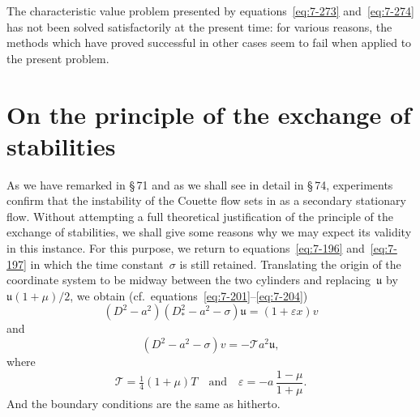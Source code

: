 The characteristic value problem presented by equations~\eqref{eq:7-273} and~\eqref{eq:7-274} has not been solved satisfactorily at the present time: for various
reasons, the methods which have proved successful in other cases seem
to fail when applied to the present problem.


\section{On the principle of the exchange of stabilities}\label{sec:7-72}

As we have remarked in \S\,71 and as we shall see in detail in \S\,74,
experiments confirm that the instability of the Couette flow sets in as a
secondary stationary flow.  Without attempting a full theoretical
justification of the principle of the exchange of stabilities, we shall give
some reasons why we may expect its validity in this instance.  For this
purpose, we return to equations~\eqref{eq:7-196} and~\eqref{eq:7-197} in which the time
constant~$\sigma$ is still retained.  Translating the origin of the coordinate
system to be midway between the two cylinders and replacing~$\mathfrak{u}$ by
$\mathfrak{u}(1+\mu)/2$, we obtain (cf.\ equations~\eqref{eq:7-201}--\eqref{eq:7-204})
\begin{equation}
\label{eq:7-276}
(D^2-a^2)(D^2_*-a^2-\sigma)\mathfrak{u} = (1+\varepsilon x)v
\end{equation}
and
\begin{equation}
\label{eq:7-277}
(D^2-a^2-\sigma)v = -\mathscr{T}a^2\mathfrak{u},
\end{equation}
where
\begin{equation}
\label{eq:7-278}
\mathscr{T} = \tfrac{1}{4}(1+\mu)T \quad \text{and} \quad
\varepsilon = -a\,\frac{1-\mu}{1+\mu}.
\end{equation}
And the boundary conditions are the same as hitherto.

